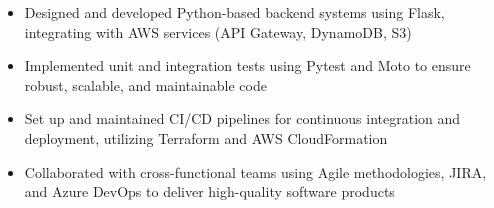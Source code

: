 \par\bigskip
{}
\par\smallskip
\begin{minipage}{13.75cm}
  \begin{minipage}{6.5cm}
    \begin{itemize}
      \item Designed and developed Python-based backend systems using Flask, integrating with AWS services (API Gateway, DynamoDB, S3)
      \item Implemented unit and integration tests using Pytest and Moto to ensure robust, scalable, and maintainable code
    \end{itemize}
  \end{minipage}
  \hfill
  \begin{minipage}{6.5cm}
    \begin{itemize}
      \item Set up and maintained CI/CD pipelines for continuous integration and deployment, utilizing Terraform and AWS CloudFormation
      \item Collaborated with cross-functional teams using Agile methodologies, JIRA, and Azure DevOps to deliver high-quality software products
    \end{itemize}
  \end{minipage}
\end{minipage}
\par\smallskip
\divider

